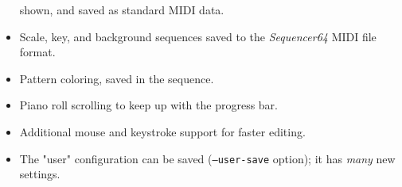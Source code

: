 \documentclass[
 11pt,
 twoside,
 a4paper,
 headinclude,
 footinclude,
 final                                 %
]{article}
\begin{document}
\begin{itemize}
         shown, and saved as standard MIDI data.
      \item Scale, key, and background sequences
         saved to the \textsl{Sequencer64} MIDI file format.
      \item Pattern coloring, saved in the sequence.
      \item Piano roll scrolling to keep up with the progress bar.
      \item Additional mouse and keystroke support for faster editing.
      \item The "user" configuration can be saved
         (\texttt{--user-save} option); it has \textsl{many} new settings.

\end{itemize}
\end{document}
